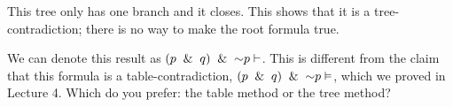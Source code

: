 \documentclass[options]{philosophersimprint}
\begin{document}
\begin{center}
\begin{minipage}[t]{0.3\textwidth}
This tree only has one branch and it closes. This shows that it is a tree-contradiction; there is no way to make the root formula true.
\vspace{1em}

We can denote this result as $(p \ \mathbin{\&} \  q) \ \mathbin{\&} \  \mathord{\sim} p\vdash$. This is different from the claim that this formula is a table-contradiction, $(p \ \mathbin{\&} \  q) \ \mathbin{\&} \  \mathord{\sim} p\vDash$, which we proved in Lecture 4. Which do you prefer: the table method or the tree method?
\end{minipage}
\hfill
\begin{minipage}[t]{0.15\textwidth}
\begin{center}
\vspace{-2em}
\qquad\qquad\qquad{} \\
\end{center}
\end{minipage}
\end{center}
\end{document}

